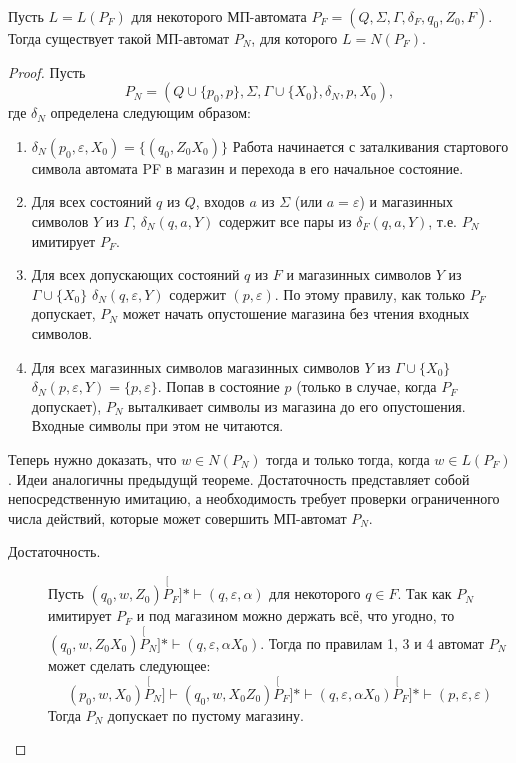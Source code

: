 \documentclass[a4paper,12pt]{article}
\begin{document}
\begin{theorem}
	Пусть $L = L(P_F)$ для некоторого МП-автомата $P_F = (Q, \Sigma, \Gamma, \delta_F, q_0, Z_0, F)$. Тогда существует такой МП-автомат $P_N$, для которого $L = N(P_F)$.
\end{theorem} 
\begin{proof}
	Пусть \[P_N = (Q \cup \{p_0, p\}, \Sigma, \Gamma \cup \{X_0\}, \delta_N, p, X_0),\]
	где $\delta_N$ определена следующим образом:
	\begin{enumerate}
		\item $\delta_N(p_0, \varepsilon, X_0) = \{(q_0, Z_0X_0)\}$ Работа начинается с заталкивания стартового символа автомата PF в магазин и перехода в его начальное состояние.
		\item Для всех состояний $q$ из $Q$, входов $a$ из $\Sigma$ (или $a = \varepsilon$) и магазинных символов $Y$ из $\Gamma$, $\delta_N(q, a, Y)$ содержит все пары из $\delta_F(q, a, Y)$, т.е. $P_N$ имитирует $P_F$.
		\item Для всех допускающих состояний $q$ из $F$ и магазинных символов $Y$ из $\Gamma \cup \{X_0\}$ $\delta_N(q, \varepsilon, Y)$ содержит $(p, \varepsilon)$. По этому правилу, как только $P_F$ допускает, $P_N$ может начать опустошение магазина без чтения входных символов.
		\item Для всех магазинных символов магазинных символов $Y$ из $\Gamma \cup \{X_0\}$ $\delta_N(p, \varepsilon, Y) = \{p, \varepsilon\}$. Попав в состояние $p$ (только в случае, когда $P_F$ допускает), $P_N$ выталкивает символы из магазина до его опустошения. Входные символы при этом не читаются.
	\end{enumerate}
	Теперь нужно доказать, что $w \in N(P_N)$ тогда и только тогда, когда $w \in L(P_F)$. Идеи аналогичны предыдущй теореме. Достаточность представляет собой непосредственную имитацию, а необходимость требует проверки ограниченного числа действий, которые может совершить МП-автомат $P_N$.
	\begin{description}
		\item[Достаточность.] Пусть $(q_0, w, Z_0) \stackrel[P_F]{*}{\vdash} (q, \varepsilon, \alpha)$ для некоторого $q \in F$. Так как $P_N$ имитирует $P_F$ и под магазином можно держать всё, что угодно, то $(q_0, w, Z_0 X_0) \stackrel[P_N]{*}{\vdash} (q, \varepsilon, \alpha X_0)$. Тогда по правилам 1, 3 и 4 автомат $P_N$ может сделать следующее:
		\[(p_0, w, X_0) \stackrel[P_N]{}{\vdash} (q_0, w, X_0Z_0)  \stackrel[P_F]{*}{\vdash} (q, \varepsilon, \alpha X_0) \stackrel[P_F]{*}{\vdash} (p, \varepsilon, \varepsilon)\]
		Тогда $P_N$ допускает по пустому магазину.
		

\end{description}
\end{proof}
\end{document}
